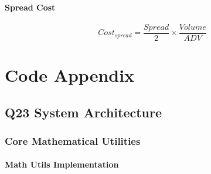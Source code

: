 \documentclass[11pt,letterpaper]{book}
\begin{document}
\subsubsection{Spread Cost}
\begin{equation}
Cost_{spread} = \frac{Spread}{2} \times \frac{Volume}{ADV}
\end{equation}

\chapter{Code Appendix}

\section{Q23 System Architecture}

\subsection{Core Mathematical Utilities}

\subsubsection{Math Utils Implementation}
\end{document}
